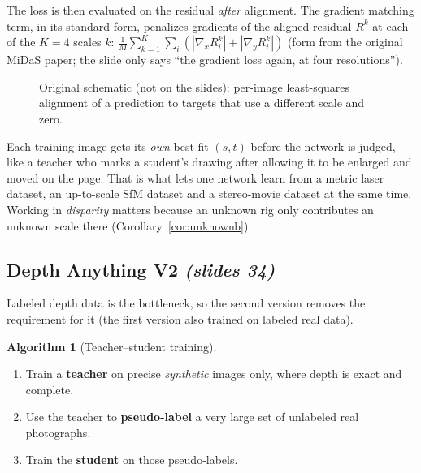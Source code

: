 \documentclass[11pt,a4paper]{article}
\numberwithin{equation}{section}
\newcommand{\slides}[1]{\texorpdfstring{\;\emph{(slides #1)}}{ (slides #1)}}
\theoremstyle{plain}
\theoremstyle{definition}
\newtheorem{algorithm}[theorem]{Algorithm}
\begin{document}
The loss is then evaluated on the residual \emph{after} alignment. The gradient matching term, in its standard form, penalizes gradients of the aligned residual $R^k$ at each of the $K=4$ scales $k$: $\frac1M\sum_{k=1}^{K}\sum_i(|\nabla_xR^k_i|+|\nabla_yR^k_i|)$ (form from the original MiDaS paper; the slide only says ``the gradient loss again, at four resolutions'').
 
\begin{figure}[htbp]
\centering
{}
\caption{Original schematic (not on the slides): per-image least-squares alignment of a prediction to targets that use a different scale and zero.}
\end{figure}
 
\begin{intuition}
Each training image gets its \emph{own} best-fit $(s,t)$ before the network is judged, like a teacher who marks a student's drawing after allowing it to be enlarged and moved on the page. That is what lets one network learn from a metric laser dataset, an up-to-scale SfM dataset and a stereo-movie dataset at the same time. Working in \emph{disparity} matters because an unknown rig only contributes an unknown scale there (Corollary~\ref{cor:unknownb}).
\end{intuition}
 
\subsection{Depth Anything V2 \slides{34}}
 
Labeled depth data is the bottleneck, so the second version removes the requirement for it (the first version also trained on labeled real data).
 
\begin{algorithm}[Teacher--student training]
\begin{enumerate}[nosep]
\item Train a \textbf{teacher} on precise \emph{synthetic} images only, where depth is exact and complete.
\item Use the teacher to \textbf{pseudo-label} a very large set of unlabeled real photographs.
\item Train the \textbf{student} on those pseudo-labels.
\end{enumerate}
\end{algorithm}
 
\end{document}
